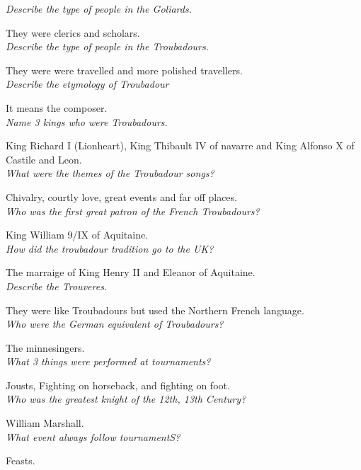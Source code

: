 \documentclass[12pt]{article}
\begin{document}
\textit{Describe the type of people in the Goliards.}

They were clerics and scholars.\\

\textit{Describe the type of people in the Troubadours.}

They were were travelled and more polished travellers.\\

\textit{Describe the etymology of Troubadour}

It means the composer.\\

\textit{Name 3 kings who were Troubadours.}

King Richard I (Lionheart), King Thibault IV of navarre and King Alfonso X of Castile and Leon.\\

\textit{What were the themes of the Troubadour songs?}

Chivalry, courtly love, great events and far off places.\\

\textit{Who was the first great patron of the French Troubadours?}

King William 9/IX of Aquitaine.\\

\textit{How did the troubadour tradition go to the UK?}

The marraige of King Henry II and Eleanor of Aquitaine.\\

\textit{Describe the Trouveres.}

They were like Troubadours but used the Northern French language.\\

\textit{Who were the German equivalent of Troubadours?}

The minnesingers.\\

\textit{What 3 things were performed at tournaments?}

Jousts, Fighting on horseback, and fighting on foot.\\

\textit{Who was the greatest knight of the 12th, 13th Century?}

William Marshall.\\

\textit{What event always follow tournamentS?}

Feasts.\\
\end{document}
